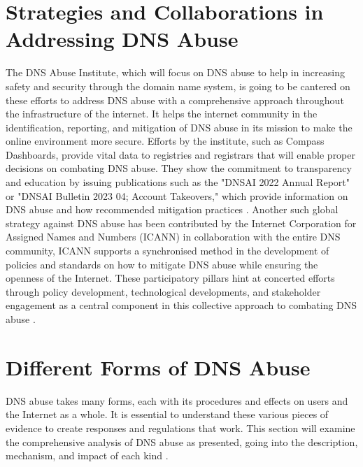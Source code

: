 \section{Strategies and Collaborations in Addressing DNS Abuse}

The DNS Abuse Institute, which will focus on DNS abuse to help in increasing safety and security through the domain name system, is going to be cantered on these efforts to address DNS abuse with a comprehensive approach throughout the infrastructure of the internet. It helps the internet community in the identification, reporting, and mitigation of DNS abuse in its mission to make the online environment more secure. Efforts by the institute, such as Compass Dashboards, provide vital data to registries and registrars that will enable proper decisions on combating DNS abuse. They show the commitment to transparency and education by issuing publications such as the "DNSAI 2022 Annual Report" or "DNSAI Bulletin 2023 04; Account Takeovers," which provide information on DNS abuse and how recommended mitigation practices \cite{dnsabuseinstitute2023}. Another such global strategy against DNS abuse has been contributed by the Internet Corporation for Assigned Names and Numbers (ICANN)\cite{icann2022dnsabuse} in collaboration with the entire DNS community, ICANN supports a synchronised method in the development of policies and standards on how to mitigate DNS abuse while ensuring the openness of the Internet. These participatory pillars hint at concerted efforts through policy development, technological developments, and stakeholder engagement as a central component in this collective approach to combating DNS abuse \cite{dnsai2022report}. 



\section{Different Forms of DNS Abuse}

DNS abuse takes many forms, each with its procedures and effects on users and the Internet as a whole. It is essential to understand these various pieces of evidence to create responses and regulations that work. This section will examine the comprehensive analysis of DNS abuse as presented, going into the description, mechanism, and impact of each kind \cite{dotmagazine2022dnsabuse}.


